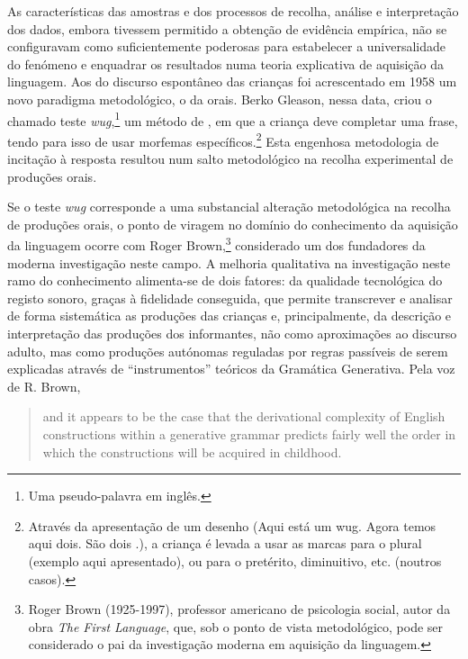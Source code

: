 \documentclass[output=paper]{LSP/langsci}
\begin{document}
As características das amostras e dos processos de recolha, análise e interpretação dos dados, embora tivessem permitido a obtenção de evidência empírica, não se configuravam como suficientemente poderosas para estabelecer a universalidade do fenómeno e enquadrar os resultados numa teoria explicativa de aquisição da linguagem. Aos  do discurso espontâneo das crianças foi acrescentado em 1958 um novo paradigma metodológico, o da  orais. Berko Gleason, nessa data, criou o chamado teste \emph{wug},\footnote{Uma pseudo-palavra em inglês.} um método de , em que a criança deve completar uma frase, tendo para isso de usar morfemas específicos.\footnote{Através da apresentação de um desenho (Aqui está um wug. Agora temos aqui dois. São dois \underline{\hspace{6em}}.), a criança é levada a usar as marcas para o plural (exemplo aqui apresentado), ou para o pretérito, diminuitivo, etc. (noutros casos).} Esta engenhosa metodologia de incitação à resposta resultou num salto metodológico na recolha experimental de produções orais. 

Se o teste \emph{wug} corresponde a uma substancial alteração metodológica na recolha de produções orais, o ponto de viragem no domínio do conhecimento da aquisição da linguagem ocorre com Roger Brown,\footnote{Roger Brown (1925-1997), professor americano de psicologia social, autor da obra \emph{The First Language}, que, sob o ponto de vista metodológico, pode ser considerado o pai da investigação moderna em aquisição da linguagem.} considerado um dos fundadores da moderna investigação neste campo. A melhoria qualitativa na investigação neste ramo do conhecimento alimenta-se de dois fatores: da qualidade tecnológica do registo sonoro, graças à fidelidade conseguida, que permite transcrever e analisar de forma sistemática as produções das crianças e, principalmente, da descrição e interpretação das produções dos informantes, não como aproximações ao discurso adulto, mas como produções autónomas reguladas por regras passíveis de serem explicadas através de ``instrumentos” teóricos da Gramática Generativa. Pela voz de R. Brown,

\begin{quote}
and it appears to be the case that the derivational complexity of English constructions within a generative grammar predicts fairly well the order in which the constructions will be acquired in childhood. \citep[115]{brown1973inbook}
\end{quote}
\end{document}
